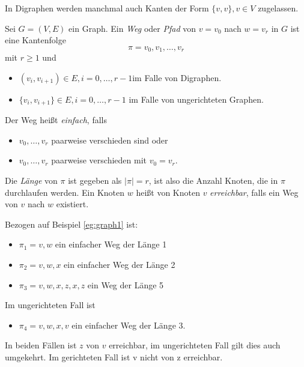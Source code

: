 \begin{remark}
In Digraphen werden manchmal auch Kanten der Form $\{v,v\}, v \in V$ zugelassen.
\end{remark}
\begin{definition}
Sei $G=(V,E)$ ein Graph. Ein \emph{Weg} oder \emph{Pfad} von $v=v_0$ nach $w=v_r$ in $G$ ist eine Kantenfolge
\[
\pi=v_0,v_1,\ldots,v_r
\]
mit $r\ge1$ und
\begin{itemize}
	\item $(v_i, v_{i+1}) \in  E, i=0,\ldots,r-1$im Falle von Digraphen.
	\item $\{v_i,v_{i+1}\}\in E, i=0,\ldots,r-1$ im Falle von ungerichteten Graphen.
\end{itemize}
Der Weg heißt \emph{einfach}, falls
\begin{itemize}
	\item $v_0,\ldots,v_r$ paarweise verschieden sind oder
	\item $v_0,\ldots,v_r$  paarweise verschieden mit $v_0=v_r$.
\end{itemize}
Die \emph{Länge} von $\pi$ ist gegeben als $|\pi|=r$, ist also die Anzahl Knoten, die in $\pi$ durchlaufen werden.
Ein Knoten $w$ heißt von Knoten $v$ \emph{erreichbar}, falls ein Weg von $v$ nach $w$ existiert.
\end{definition}
\begin{example}
Bezogen auf Beispiel \ref{eg:graph1} ist:
\begin{itemize}
	\item $\pi_1= v,w$ ein einfacher Weg der Länge 1
	\item $\pi_2 =v,w,x$ ein einfacher Weg der Länge 2
	\item $\pi_3=v,w,x,z,x,z$ ein Weg der Länge 5
\end{itemize}
Im ungerichteten Fall ist 
\begin{itemize}
	\item $\pi_4=v,w,x,v$ ein einfacher Weg der Länge 3.
\end{itemize}
In beiden Fällen ist $z$ von $v$ erreichbar, im ungerichteten Fall gilt dies auch umgekehrt. Im gerichteten Fall ist v nicht von z erreichbar.
\end{example}
